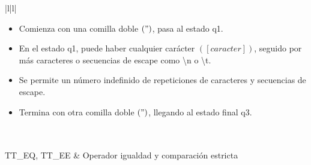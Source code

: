 \begin{center}
\begin{longtable}{|l|l|}
{\begin{minipage}{0.9\textwidth
      }
\begin{itemize}
          \item Comienza con una comilla doble $(")$, pasa al estado q1.
          \item En el estado q1, puede haber cualquier carácter $([caracter])$, seguido por más caracteres o secuencias de escape como \textbackslash n o \textbackslash t.
          \item Se permite un número indefinido de repeticiones de caracteres y secuencias de escape.
          \item Termina con otra comilla doble $(")$, llegando al estado final q3.
        \end{itemize}
      \end{minipage}
    } \\
     \\
    \hline
    TT\_EQ, TT\_EE & Operador igualdad y comparación estricta \\
    \hline
     \\
     \\
     \\
\end{longtable}
\end{center}
